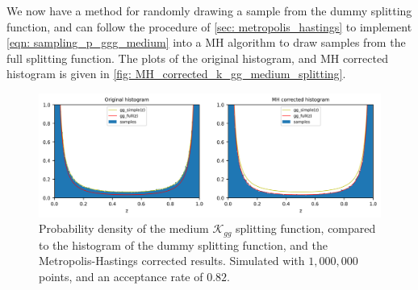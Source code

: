 \documentclass[main.tex]{subfiles}
\begin{document}
We now have a method for randomly drawing a sample from the dummy splitting function, and can follow the procedure of \autoref{sec: metropolis_hastings} to implement \autoref{eqn: sampling_p_ggg_medium} into a MH algorithm to draw samples from the full splitting function. The plots of the original histogram, and MH corrected histogram is given in \autoref{fig: MH_corrected_k_gg_medium_splitting}.
\begin{figure}[htb]
    \centering
    \includegraphics[width=15cm]{pictures/plots/Metropolis-Hastings/MH_medium_gg.png}
    \caption{Probability density of the medium \(\mathcal{K}_{gg}\) splitting function, compared to the histogram of the dummy splitting function, and the Metropolis-Hastings corrected results. Simulated with \(1,000,000\) points, and an acceptance rate of \(0.82\).}
    \label{fig: MH_corrected_k_gg_medium_splitting}
\end{figure}
\end{document}
